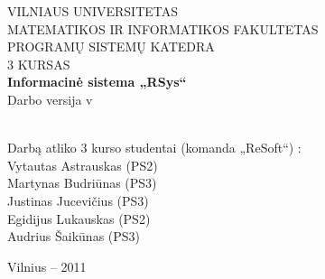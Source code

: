 \begin{titlepage}

  \begin{center}
    \uppercase
    {\normalsize
      Vilniaus universitetas\\
      Matematikos ir informatikos fakultetas\\
      Programų sistemų katedra\\
      3 kursas
    }\\[6.0cm]

    {\Huge\bf
      Informacinė sistema „RSys“ 
    }\\[0.5cm]
    
    Darbo versija v\docversion\\[2.0cm]
    
    {\LARGE
      \docname
    }\\[4.0cm]
    
  \end{center}
  
  \begin{flushright}
    Darbą atliko 3 kurso studentai (komanda „ReSoft“) :\\
    Vytautas Astrauskas (PS2)\\
    Martynas Budriūnas (PS3)\\
    Justinas Jucevičius (PS3)\\
    Egidijus Lukauskas (PS2)\\
    Audrius Šaikūnas (PS3)
  \end{flushright}
  
  \begin{center}
    \vfill{Vilnius – 2011}
  \end{center}

\end{titlepage}
